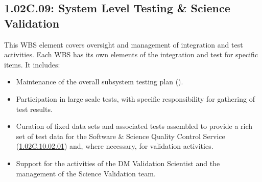 \subsection*{1.02C.09: System Level Testing \& Science Validation}
\label{wbs:1.02C.09}

This WBS element covers oversight and management of integration and test activities. Each WBS has its own elements of the integration and test for specific items. It includes:

\begin{itemize}

\item{Maintenance of the overall subsystem testing plan ().}

\item{Participation in large scale tests, with specific responsibility for
gathering of test results.}

\item{Curation of fixed data sets and associated tests assembled to provide a
rich set of test data for the Software \& Science Quality Control Service
(\hyperref[wbs:1.02C.10.02.01]{1.02C.10.02.01}) and, where necessary, for
validation activities.}

\item{Support for the activities of the DM Validation Scientist and the
management of the Science Validation team.}

\end{itemize}


